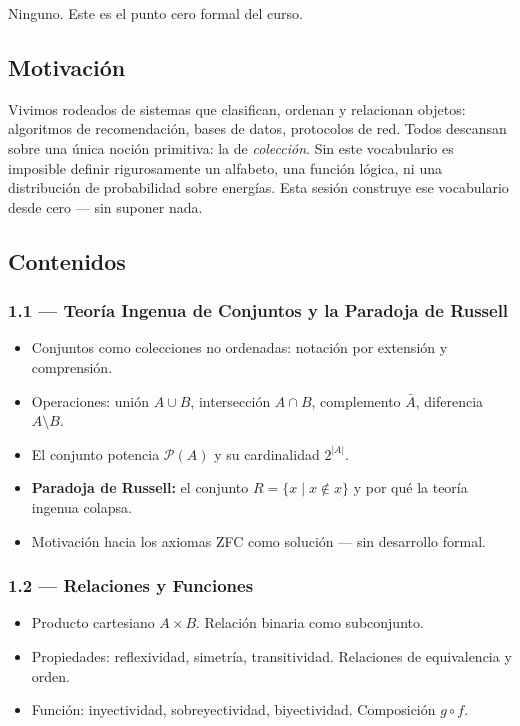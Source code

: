 \documentclass[11pt, letterpaper]{article}
\begin{document}
\begin{prereqs}
Ninguno. Este es el punto cero formal del curso.
\end{prereqs}

\subsection*{Motivaci\'on}
Vivimos rodeados de sistemas que clasifican, ordenan y relacionan objetos: algoritmos de recomendaci\'on, bases de datos, protocolos de red. Todos descansan sobre una \'unica noci\'on primitiva: la de \emph{colecci\'on}. Sin este vocabulario es imposible definir rigurosamente un alfabeto, una funci\'on l\'ogica, ni una distribuci\'on de probabilidad sobre energ\'ias. Esta sesi\'on construye ese vocabulario desde cero --- sin suponer nada.

\subsection{Contenidos}

\subsubsection{1.1 --- Teor\'ia Ingenua de Conjuntos y la Paradoja de Russell}
\begin{itemize}
  \item Conjuntos como colecciones no ordenadas: notaci\'on por extensi\'on y comprensi\'on.
  \item Operaciones: uni\'on $A\cup B$, intersecci\'on $A\cap B$, complemento $\bar{A}$, diferencia $A\setminus B$.
  \item El conjunto potencia $\mathcal{P}(A)$ y su cardinalidad $2^{|A|}$.
  \item \textbf{Paradoja de Russell:} el conjunto $R=\{x \mid x\notin x\}$ y por qu\'e la teor\'ia ingenua colapsa.
  \item Motivaci\'on hacia los axiomas ZFC como soluci\'on --- sin desarrollo formal.
\end{itemize}

\subsubsection{1.2 --- Relaciones y Funciones}
\begin{itemize}
  \item Producto cartesiano $A\times B$. Relaci\'on binaria como subconjunto.
  \item Propiedades: reflexividad, simetr\'ia, transitividad. Relaciones de equivalencia y orden.
  \item Funci\'on: inyectividad, sobreyectividad, biyectividad. Composici\'on $g\circ f$.
\end{itemize}
\end{document}
